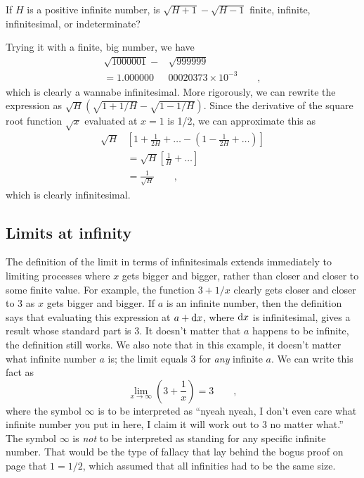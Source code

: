\begin{eg}
\egquestion If $H$ is a positive infinite number, is $\sqrt{H+1}-\sqrt{H-1}$
finite, infinite, infinitesimal, or indeterminate?

\eganswer Trying it with a finite, big number, we have
\begin{align*}
  \sqrt{1000001}-&\sqrt{999999} \\
    = 1.000000&00020373\times 10^{-3} \qquad ,
\end{align*}
which is clearly a wannabe infinitesimal. More rigorously, we can rewrite
the expression as $\sqrt{H}(\sqrt{1+1/H}-\sqrt{1-1/H})$. Since the derivative
of the square root function $\sqrt{x}$ evaluated at $x=1$ is 1/2, we can
approximate this as
\begin{align*}
  \sqrt{H}&\left[1+\frac{1}{2H}+\ldots-\left(1-\frac{1}{2H}+\ldots\right)\right] \\
    &= \sqrt{H}\left[\frac{1}{H}+\ldots\right] \\
    &= \frac{1}{\sqrt{H}} \qquad ,
\end{align*}
which is clearly infinitesimal.
\end{eg}

\subsection{Limits at infinity}

The definition of the limit in terms of infinitesimals extends immediately to limiting
processes where $x$ gets bigger and bigger, rather than closer and closer to some
finite value. For example, the function $3+1/x$ clearly gets closer and closer to
3 as $x$ gets bigger and bigger. If $a$ is an infinite number, then the definition
says that evaluating this expression at $a+\textup{d} x$, where $\textup{d} x$ is infinitesimal,
gives a result whose standard part is 3. It doesn't matter that $a$ happens to be
infinite, the definition still works. We also note that in this example, it doesn't
matter what infinite number $a$ is; the limit equals 3 for \emph{any} infinite $a$.
We can write this fact as
\begin{equation*}
   \lim_{x\rightarrow \infty} \left(3+\frac{1}{x}\right) =3 \qquad ,
\end{equation*}
where the symbol $\infty$ is to be interpreted as ``nyeah nyeah, I don't even care
what infinite number you put in here, I claim it will work out to 3 no matter what.''
The symbol $\infty$ is \emph{not} to be interpreted as standing for any specific
infinite number. That would be the type of fallacy that lay behind the bogus proof
on page \pageref{bogus-proof} that $1=1/2$, which assumed that all infinities had to be
the same size.

